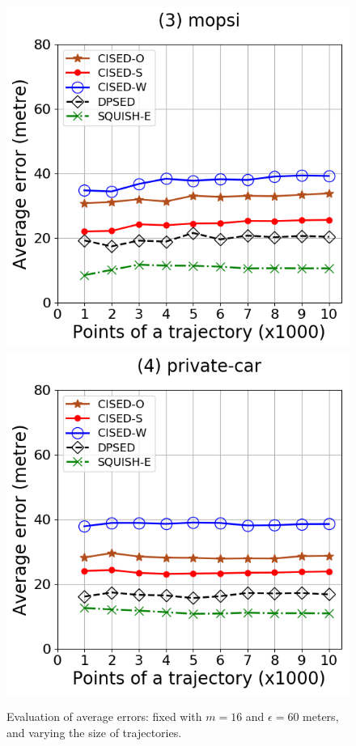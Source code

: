 \begin{figure}[tb!]
\includegraphics[scale = 0.30]{Figures/Exp-error-size-mopsi.png}
\includegraphics[scale = 0.30]{Figures/Exp-error-size-private.png}
\caption{\small Evaluation of average errors: fixed with $m=16$ and $\epsilon=60$ meters, and varying the size of trajectories.}
\label{fig:ae-size}
\end{figure}


